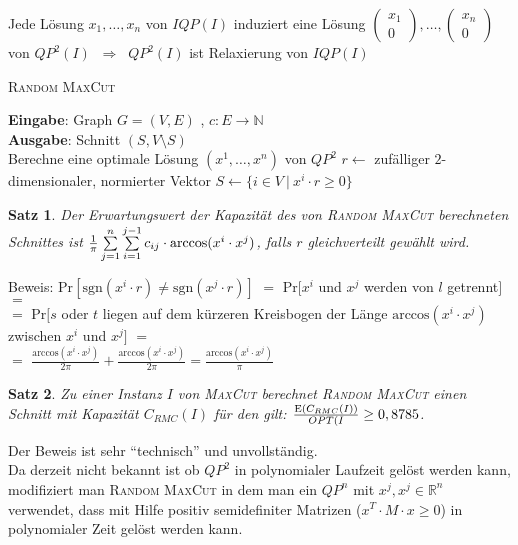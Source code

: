 \documentclass[a4paper,10pt]{scrartcl}
\newcommand{\tbf}{\textbf}
\newcommand{\tsc}{\textsc}
\newcommand{\Ra}{\Rightarrow}
\newcommand{\agn}{\leftarrow}
\newcommand{\Ree}{\mathbb{R}}
\newcommand{\Gr}{$G = (V,E)$ }
\newcommand{\Gwfktn}{$c: E \rightarrow \mathbb{N}$ }
\newcommand{\Cut}{$(S,V \setminus S)$ }
\renewcommand{\Pr}{\text{Pr}}
\newcommand{\Eingabe}[1]{\STATE \tbf{Eingabe}: #1 \\}
\newcommand{\Ausgabe}[1]{\STATE \tbf{Ausgabe}: #1 \\}
\newtheorem{satz}{Satz}
\begin{document}
Jede Lösung $x_1, \ldots, x_n$ von $IQP(I)$ induziert eine Lösung $\begin{pmatrix} x_1 \\ 0 \end{pmatrix}, \ldots, \begin{pmatrix} x_n \\ 0 \end{pmatrix}$ von $QP^2(I)$ $\ \Ra \ $ $QP^2(I)$ ist Relaxierung von $IQP(I)$ \\

\begin{algorithm}
\caption{\tsc{Random MaxCut}}
\begin{algorithmic}
\Eingabe{Graph \Gr, \Gwfktn}
\Ausgabe{Schnitt \Cut}
\STATE Berechne eine optimale Lösung $(x^1, \ldots, x^n)$ von $QP^2$
\STATE $r \agn$ zufälliger $2$-dimensionaler, normierter Vektor
\STATE $S \agn \{ i \in V \ | \ x^i \cdot r \geq 0 \}$ 
\end{algorithmic}
\end{algorithm}

\begin{satz}
 Der Erwartungswert der Kapazität des von \tsc{Random MaxCut} berechneten Schnittes ist $\frac{1}{\pi} \sum_{j=1}^n \limits \sum_{i=1}^{j-1} \limits c_{ij} \cdot \text{\upshape{arccos}}(x^i \cdot x^j)$, falls $r$ gleichverteilt gewählt wird.
\end{satz}

Beweis: $\Pr[\text{sgn}(x^i \cdot r) \not = \text{sgn}(x^j \cdot r)]$ $=$ $\Pr[x^i$ und $x^j$ werden von $l$ getrennt$]$ $=$ \\
$=$ $\Pr[s$ oder $t$ liegen auf dem kürzeren Kreisbogen der Länge $\text{arccos}(x^i \cdot x^j)$ zwischen $x^i$ und $x^j]$ $=$ \\
$=$ $\frac{\text{arccos}(x^i \cdot x^j)}{2\pi} + \frac{\text{arccos}(x^i \cdot x^j)}{2\pi} = \frac{\text{arccos}(x^i \cdot x^j)}{\pi}$

\begin{satz}
 Zu einer Instanz $I$ von \tsc{MaxCut} berechnet \tsc{Random MaxCut} einen Schnitt mit Kapazität $C_{RMC}(I)$ für den gilt: $\frac{\text{\upshape{E}}(C_{RMC}(I))}{OPT(I} \geq 0,8785$.
\end{satz}

Der Beweis ist sehr ``technisch'' und unvollständig. \\

Da derzeit nicht bekannt ist ob $QP^2$ in polynomialer Laufzeit gelöst werden kann, modifiziert man \tsc{Random MaxCut} in dem man ein $QP^n$ mit $x^j, x^j \in \Ree^n$ verwendet, dass mit Hilfe positiv semidefiniter Matrizen ($x^T \cdot M \cdot x \geq 0$) in polynomialer Zeit gelöst werden kann. \\
\end{document}
